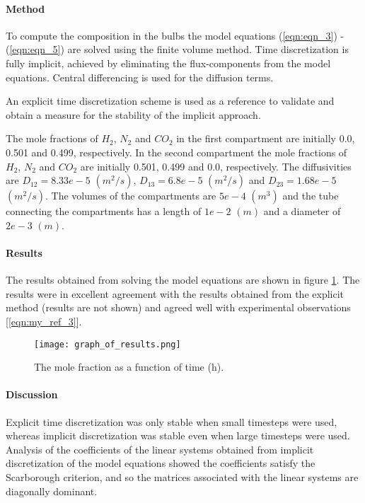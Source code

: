 \documentclass[twocolumn]{article}
\begin{document}
\paragraph*{Method}
To compute the composition in the bulbs the model equations (\ref{eqn:eqn_3}) - (\ref{eqn:eqn_5}) are solved using the finite volume method. Time discretization is fully implicit, achieved by eliminating the flux-components from the model equations. Central differencing is used for the diffusion terms.

An explicit time discretization scheme is used as a reference to validate and obtain a measure for the stability of the implicit approach.

The mole fractions of $H_2$, $N_2$ and $CO_2$ in the first compartment are initially 0.0, 0.501 and 0.499, respectively. In the second compartment the mole fractions of $H_2$, $N_2$ and $CO_2$ are initially 0.501, 0.499 and 0.0, respectively. The diffusivities are $D_{12} = 8.33e-5$  $(m^2/s)$, $D_{13} = 6.8e-5$ $(m^2/s)$ and $D_{23} = 1.68e-5$ $(m^2/s)$. The volumes of the compartments are $5e-4$ $(m^3)$ and the tube connecting the compartments has a length of $1e-2$ $(m)$ and a diameter of $2e-3$ $(m)$. 

\paragraph*{Results} 
The results obtained from solving the model equations are shown in figure \ref{fig:fig_1}. The results were in excellent agreement with the results obtained from the explicit method (results are not shown) and agreed well with experimental observations [\ref{eqn:my_ref_3}].

\begin{figure}
\texttt{[image: graph\_of\_results.png]}
\caption{The mole fraction as a function of time (h).}
\label{fig:fig_1}
\end{figure}

\paragraph*{Discussion}
Explicit time discretization was only stable when small timesteps were used, whereas implicit discretization was stable even when large timesteps were used. Analysis of the coefficients of the linear systems obtained from implicit discretization of the model equations showed the coefficients satisfy the Scarborough criterion, and so the matrices associated with the linear systems are diagonally dominant.
\end{document}
